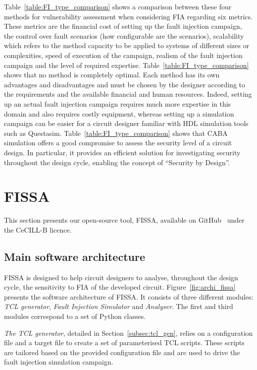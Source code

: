 Table~\ref{table:FI_type_comparison} shows a comparison between these four methods for vulnerability assessment when considering FIA regarding six metrics. These metrics are the financial cost of setting up the fault injection campaign, the control over fault scenarios (how configurable are the scenarios), scalability which refers to the method capacity to be applied to systems of different sizes or complexities, speed of execution of the campaign, realism of the fault injection campaign and the level of required expertise.
Table~\ref{table:FI_type_comparison} shows that no method is completely optimal. Each method has its own advantages and disadvantages and must be chosen by the designer according to the requirements and the available financial and human resources. Indeed, setting up an actual fault injection campaign requires much more expertise in this domain and also requires costly equipment, whereas setting up a simulation campaign can be easier for a circuit designer familiar with HDL simulation tools such as Questasim.
Table~\ref{table:FI_type_comparison} shows that CABA simulation offers a good compromise to assess the security level of a circuit design. In particular, it provides an efficient solution for investigating security throughout the design cycle, enabling the concept of “Security by Design”.

\section{FISSA}
This section presents our open-source tool, FISSA, available on GitHub~\cite{fissa} under the CeCILL-B licence.

\subsection{Main software architecture}
FISSA is designed to help circuit designers to analyse, throughout the design cycle, the sensitivity to FIA of the developed circuit.
Figure~\ref{fig:archi_fissa} presents the software architecture of FISSA.
It consists of three different modules: \textit{TCL generator}, \textit{Fault Injection Simulator} and \textit{Analyser}. The first and third modules correspond to a set of Python classes.

\textit{The TCL generator}, detailed in Section~\ref{subsec:tcl_gen}, relies on a configuration file and a target file to create a set of parameterised TCL scripts. These scripts are tailored based on the provided configuration file and are used to drive the fault injection simulation campaign.

